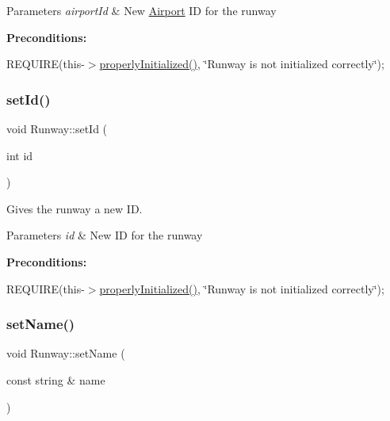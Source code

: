 \begin{DoxyParams}{Parameters}
{\em airport\+Id} & New \mbox{\hyperlink{class_airport}{Airport}} ID for the runway\\
\hline
\end{DoxyParams}
{\bfseries Preconditions\+:}
\begin{DoxyItemize}
\item R\+E\+Q\+U\+I\+RE(this-\/$>$\mbox{\hyperlink{class_runway_a360d98246cabf3aa929765f81a656348}{properly\+Initialized()}}, \char`\"{}\+Runway is not initialized correctly\char`\"{}); 
\end{DoxyItemize}\mbox{\label{class_runway_af587fc8f841c10a99427cf7a0f442fce}} 
\subsubsection{\texorpdfstring{set\+Id()}{setId()}}
{\footnotesize\ttfamily void Runway\+::set\+Id (\begin{DoxyParamCaption}\item[{int}]{id }\end{DoxyParamCaption})}



Gives the runway a new ID. 


\begin{DoxyParams}{Parameters}
{\em id} & New ID for the runway\\
\hline
\end{DoxyParams}
{\bfseries Preconditions\+:}
\begin{DoxyItemize}
\item R\+E\+Q\+U\+I\+RE(this-\/$>$\mbox{\hyperlink{class_runway_a360d98246cabf3aa929765f81a656348}{properly\+Initialized()}}, \char`\"{}\+Runway is not initialized correctly\char`\"{}); 
\end{DoxyItemize}\mbox{\label{class_runway_ab601d0a69ecffc0042d69cf0eb0cdaba}} 
\subsubsection{\texorpdfstring{set\+Name()}{setName()}}
{\footnotesize\ttfamily void Runway\+::set\+Name (\begin{DoxyParamCaption}\item[{const string \&}]{name }\end{DoxyParamCaption})}



